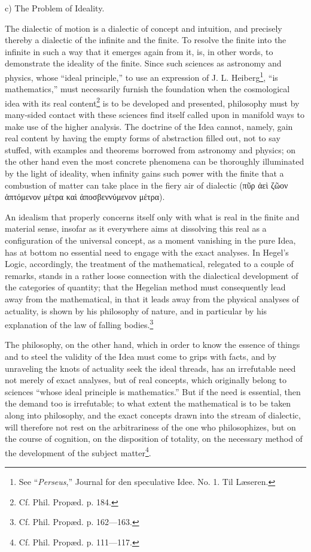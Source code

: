 \documentclass[12pt,a4paper,openany]{book}
\newcommand{\opage}[1]{\marginnote{\footnotesize\textit{[#1]}}}
\begin{document}
\begin{center}c) The Problem of Ideality.\end{center}

The dialectic of motion is a dialectic of concept and intuition, and precisely thereby a dialectic of the infinite and the finite. To resolve the finite into the infinite in such a way that it emerges again from it, is, in other words, to demonstrate the ideality of the finite. Since such sciences as astronomy and physics, whose ``ideal principle,'' to use an expression of J. L. Heiberg\footnote[1]{See ``\emph{Perseus},'' Journal for den speculative Idee. No. 1. Til Læseren.},
``is mathematics,'' must necessarily furnish the foundation when the cosmological idea with its real content\footnote[2]{Cf. Phil. Propæd. p. 184.} is to be developed and presented, philosophy must by many-sided
\setcounter{footnote}{0}%
\opage{147}contact with these sciences find itself called upon in manifold ways to make use of the higher analysis. The doctrine of the Idea cannot, namely, gain real content by having the empty forms of abstraction filled out, not to say stuffed, with examples and theorems borrowed from astronomy and physics; on the other hand even the most concrete phenomena can be thoroughly illuminated by the light of ideality, when infinity %
gains such power with the finite that a combustion of matter can take place in the fiery air of dialectic
(πῦρ ἀεὶ ζῶον ἁπτόμενον μέτρα καὶ ἀποσβεννύμενον μέτρα).

An idealism that properly concerns itself only with what is real in the finite and material sense, insofar as it everywhere aims at dissolving this real as a configuration of the universal concept, as a moment vanishing in the pure Idea, has at bottom no essential need to engage with the exact analyses. In Hegel's Logic, accordingly, the treatment of the mathematical, relegated to a couple of remarks, stands in a rather loose connection with the dialectical development of the categories of quantity; that the Hegelian method must consequently lead away from the mathematical, in that it leads away from the physical analyses of actuality, is shown by his philosophy of nature, and in particular by his explanation of the law of falling bodies.\footnote[1]{Cf. Phil. Propæd. p. 162—163.}

The philosophy, on the other hand, which in order to know the essence of things and to steel the validity of the Idea must come to grips with facts, and by unraveling the knots of actuality seek the ideal threads, has an irrefutable need not merely of exact analyses, but of real concepts, which originally belong to sciences ``whose ideal principle is mathematics.'' But if the need is essential, then the demand too is irrefutable; to what extent the mathematical is to be taken along into philosophy, and the exact concepts drawn into the stream of dialectic, will therefore not rest on the
\setcounter{footnote}{0}%
\opage{148}arbitrariness of the one who philosophizes, but on the course of cognition, on the disposition of totality, on the necessary method of the development of the subject matter\footnote[1]{Cf. Phil. Propæd. p. 111—117.}.
\end{document}
